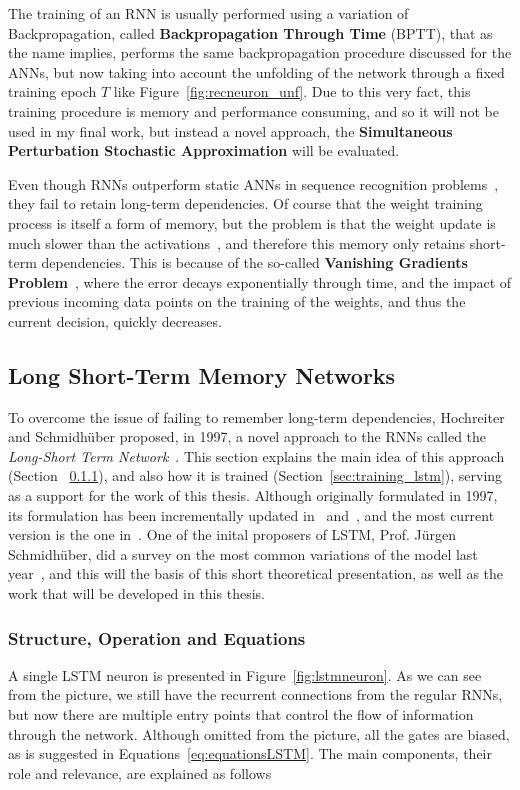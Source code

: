 The training of an RNN is usually performed using a variation of Backpropagation, called \textbf{Backpropagation Through Time} (BPTT), that as the name implies, performs the same backpropagation procedure discussed for the ANNs, but now taking into account the unfolding of the network through a fixed training epoch $T$ like Figure~\ref{fig:recneuron_unf}. Due to this very fact, this training procedure is memory and performance consuming, and so it will not be used in my final work, but instead a novel approach, the \textbf{Simultaneous Perturbation Stochastic Approximation} will be evaluated. 

Even though RNNs outperform static ANNs in sequence recognition problems~\cite{Bengio1991}, they fail to retain long-term dependencies. Of course that the weight training process is itself a form of memory, but the problem is that the weight update is much slower than the activations~\cite{Yoshua01}, and therefore this memory only retains short-term dependencies. This is because of the so-called \textbf{Vanishing Gradients Problem}~\cite{Yoshua94,Yoshua01}, where the error decays exponentially through time, and the impact of previous incoming data points on the training of the weights, and thus the current decision, quickly decreases. 


\subsection{Long Short-Term Memory Networks}\label{sec:theorBack_lstm}
To overcome the issue of failing to remember long-term dependencies, Hochreiter and Schmidhüber proposed, in 1997, a novel approach to the RNNs called the \textit{Long-Short Term Network}~\cite{Hoch97}. This section explains the main idea of this approach (Section ~\ref{sec:struct_lstm}), and also how it is trained (Section~\ref{sec:training_lstm}), serving as a support for the work of this thesis.
Although originally formulated in 1997, its formulation has been incrementally updated in~\cite{Gers00} and~\cite{Gers2000}, and the most current version is the one in~\cite{Graves05}. One of the inital proposers of LSTM, Prof. Jürgen Schmidhüber, did a survey on the most common variations of the model last year~\cite{Greff15}, and this will the basis of this short theoretical presentation, as well as the work that will be developed in this thesis. 

\subsubsection{Structure, Operation and Equations}\label{sec:struct_lstm}
A single LSTM neuron is presented in Figure~\ref{fig:lstmneuron}. As we can see from the picture, we still have the recurrent connections from the regular RNNs, but now there are multiple entry points that control the flow of information through the network. Although omitted from the picture, all the gates are biased, as is suggested in Equations~\ref{eq:equationsLSTM}. The main components, their role and relevance, are explained as follows

